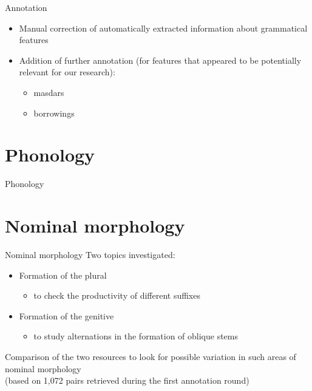 \begin{frame}{Annotation}
\begin{itemize}
    \item Manual correction of automatically extracted information about grammatical features
    \item Addition of further annotation (for features that appeared to be potentially relevant for our research):
    \begin{itemize}
        \item masdars
        \item borrowings
    \end{itemize}
\end{itemize}
    
\end{frame}

\section{Phonology}
\begin{frame}{Phonology}
\end{frame}

\section{Nominal morphology}
\begin{frame}{Nominal morphology}
Two topics investigated:
\begin{itemize}
    \item Formation of the plural
    \begin{itemize}
        \item to check the productivity of different suffixes
    \end{itemize}
    \item Formation of the genitive
    \begin{itemize}
        \item to study alternations in the formation of oblique stems
    \end{itemize}
\end{itemize}
Comparison of the two resources to look for possible variation in such areas of nominal morphology \\ (based on 1,072 pairs retrieved during the first annotation round)
\end{frame}

